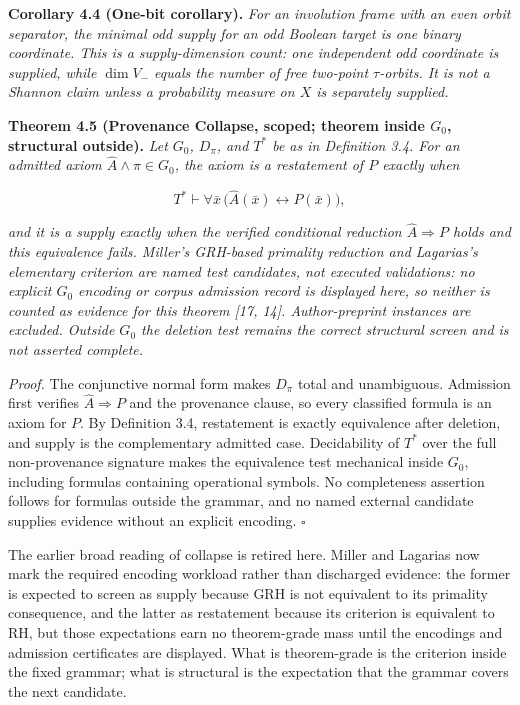 \documentclass[10pt,twocolumn]{article}
\begin{document}
\textbf{Corollary 4.4 (One-bit corollary).} \emph{For an involution
frame with an even orbit separator, the minimal odd supply for an odd
Boolean target is one binary coordinate. This is a supply-dimension
count: one independent odd coordinate is supplied, while \(\dim V_-\)
equals the number of free two-point \(\tau\)-orbits. It is not a Shannon
claim unless a probability measure on \(X\) is separately supplied.}

\textbf{Theorem 4.5 (Provenance Collapse, scoped; theorem inside
\(G_0\), structural outside).} \emph{Let \(G_0\), \(D_\pi\), and \(T^*\)
be as in Definition 3.4. For an admitted axiom
\(\widehat{A} \wedge \pi \in G_0\), the axiom is a restatement of \(P\)
exactly when}

\[T^* \vdash \forall \bar{x}\, \bigl( \widehat{A}(\bar{x}) \leftrightarrow P(\bar{x}) \bigr),\]

\emph{and it is a supply exactly when the verified conditional reduction
\(\widehat{A} \Rightarrow P\) holds and this equivalence fails. Miller's
GRH-based primality reduction and Lagarias's elementary criterion are
named test candidates, not executed validations: no explicit \(G_0\)
encoding or corpus admission record is displayed here, so neither is
counted as evidence for this theorem {[}17, 14{]}. Author-preprint
instances are excluded. Outside \(G_0\) the deletion test remains the
correct structural screen and is not asserted complete.}

\emph{Proof.} The conjunctive normal form makes \(D_\pi\) total and
unambiguous. Admission first verifies \(\widehat{A} \Rightarrow P\) and
the provenance clause, so every classified formula is an axiom for
\(P\). By Definition 3.4, restatement is exactly equivalence after
deletion, and supply is the complementary admitted case. Decidability of
\(T^*\) over the full non-provenance signature makes the equivalence
test mechanical inside \(G_0\), including formulas containing
operational symbols. No completeness assertion follows for formulas
outside the grammar, and no named external candidate supplies evidence
without an explicit encoding. \(\square\)

The earlier broad reading of collapse is retired here. Miller and
Lagarias now mark the required encoding workload rather than discharged
evidence: the former is expected to screen as supply because GRH is not
equivalent to its primality consequence, and the latter as restatement
because its criterion is equivalent to RH, but those expectations earn
no theorem-grade mass until the encodings and admission certificates are
displayed. What is theorem-grade is the criterion inside the fixed
grammar; what is structural is the expectation that the grammar covers
the next candidate.
\end{document}
